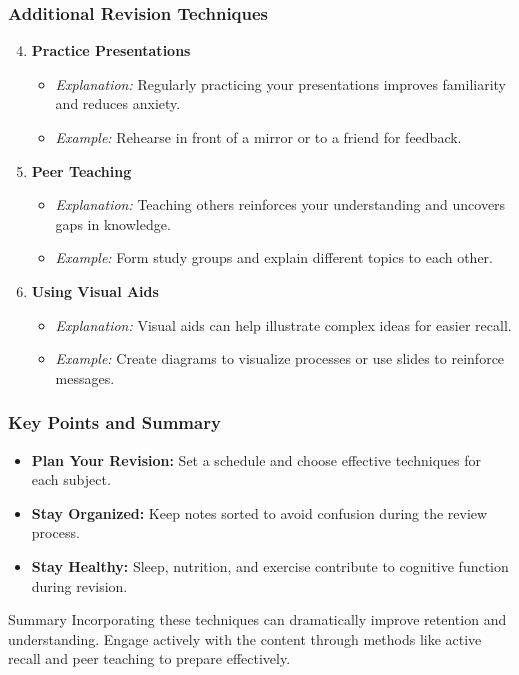 \documentclass[aspectratio=169]{beamer}
\begin{document}
\begin{frame}[fragile]
    \frametitle{Additional Revision Techniques}
    \begin{enumerate}
        \setcounter{enumi}{3}
        \item \textbf{Practice Presentations}
        \begin{itemize}
            \item \textit{Explanation:} Regularly practicing your presentations improves familiarity and reduces anxiety.
            \item \textit{Example:} Rehearse in front of a mirror or to a friend for feedback.
        \end{itemize}
        
        \item \textbf{Peer Teaching}
        \begin{itemize}
            \item \textit{Explanation:} Teaching others reinforces your understanding and uncovers gaps in knowledge.
            \item \textit{Example:} Form study groups and explain different topics to each other.
        \end{itemize}
        
        \item \textbf{Using Visual Aids}
        \begin{itemize}
            \item \textit{Explanation:} Visual aids can help illustrate complex ideas for easier recall.
            \item \textit{Example:} Create diagrams to visualize processes or use slides to reinforce messages.
        \end{itemize}
    \end{enumerate}
\end{frame}

\begin{frame}[fragile]
    \frametitle{Key Points and Summary}
    \begin{itemize}
        \item \textbf{Plan Your Revision:} Set a schedule and choose effective techniques for each subject.
        \item \textbf{Stay Organized:} Keep notes sorted to avoid confusion during the review process.
        \item \textbf{Stay Healthy:} Sleep, nutrition, and exercise contribute to cognitive function during revision.
    \end{itemize}
    
    \begin{block}{Summary}
        Incorporating these techniques can dramatically improve retention and understanding. Engage actively with the content through methods like active recall and peer teaching to prepare effectively.
    \end{block}
\end{frame}
\end{document}
